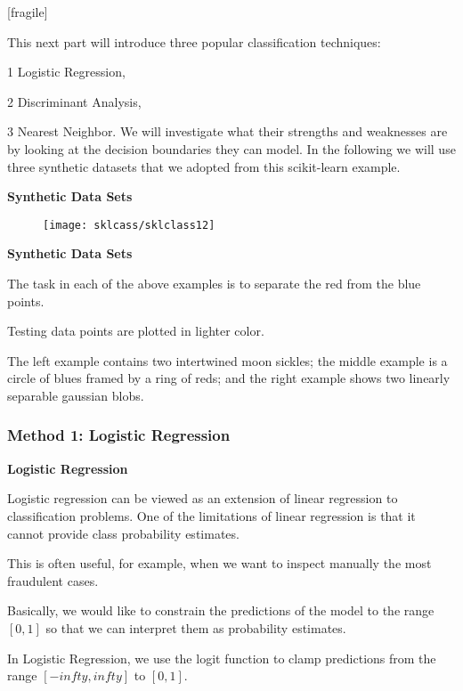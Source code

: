 \documentclass[MASTER.tex]{subfiles}
\begin{document}
 
 [fragile]
 
This next part will introduce three popular classification techniques: 
 
\item[1] Logistic Regression, 
\item[2] Discriminant Analysis, 
\item[3] Nearest Neighbor.
  We will investigate what their strengths and weaknesses are by looking at the decision boundaries they can model. In the following we will use three synthetic datasets that we adopted from this scikit-learn example.
 
 
 \textbf{Synthetic Data Sets}
\begin{figure}
\centering
\texttt{[image: sklcass/sklclass12]}

\end{figure}
 
 
\textbf{Synthetic Data Sets}
 
\item The task in each of the above examples is to separate the red from the blue points. 
\item Testing data points are plotted in lighter color. 
\item The left example contains two intertwined moon sickles; the middle example is a circle of blues framed by a ring of reds; and the right example shows two linearly separable gaussian blobs.
 

 

 
  \frametitle{Method 1: Logistic Regression}
\textbf{Logistic Regression}
 
\item Logistic regression can be viewed as an extension of linear regression to classification problems.  One of the limitations of linear regression is that it cannot provide class probability estimates. 
\item This is often useful, for example, when we want to inspect manually the most fraudulent cases. 
\item Basically, we would like to constrain the predictions of the model to the range $[0,1]$ so that we can interpret them as probability estimates. 
\item In Logistic Regression, we use the logit function to clamp predictions from the range $[−infty,infty]$ to $[0,1]$. 
 
\end{document}
